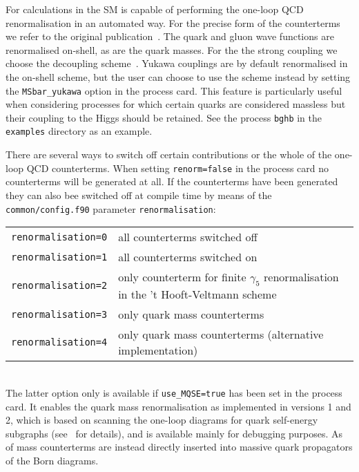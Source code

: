 For calculations in the SM \gosam is capable of performing the one-loop QCD renormalisation in an automated way. For the precise form of the counterterms we refer to the original \gosam publication~\cite{Cullen:2011ac}. The quark and gluon wave functions are renormalised on-shell, as are the quark masses. For the the strong coupling we choose the decoupling scheme~\cite{Bernreuther:1981sg}. Yukawa couplings are by default renormalised in the on-shell scheme, but the user can choose to use the \MSb scheme instead by setting the \texttt{MSbar\_yukawa} option in the process card. This feature is particularly useful when considering processes for which certain quarks are considered massless but their coupling to the Higgs should be retained. See the process \texttt{bghb} in the \texttt{examples} directory as an example.

There are several ways to switch off certain contributions or the whole of the one-loop QCD counterterms. When setting \texttt{renorm=false} in the process card no counterterms will be generated at all. If the counterterms have been generated they can also bee switched off at compile time by means of the \texttt{common/config.f90} parameter \texttt{renormalisation}:\\

\renewcommand{\arraystretch}{1.5}
\begin{tabular}{lp{}}
    \texttt{renormalisation=0} & all counterterms switched off\\
    \texttt{renormalisation=1} & all counterterms switched on\\
    \texttt{renormalisation=2} & only counterterm for finite $\gamma_5$ renormalisation in the 't Hooft-Veltmann scheme\\
    \texttt{renormalisation=3} & only quark mass counterterms\\
    \texttt{renormalisation=4} & only quark mass counterterms (alternative implementation)
\end{tabular}
\renewcommand{\arraystretch}{1.0}\\[10pt]

The latter option only is available if \texttt{use\_MQSE=true} has been set in the process card. It enables the quark mass renormalisation as implemented in \gosam versions 1 and 2, which is based on scanning the one-loop diagrams for quark self-energy subgraphs (see~\cite{Cullen:2011ac} for details), and is available mainly for debugging purposes. As of  mass counterterms are instead directly inserted into massive quark propagators of the Born diagrams.

